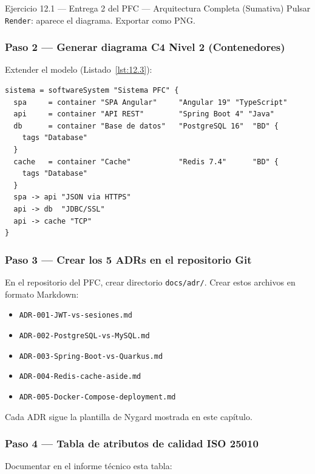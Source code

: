 \begin{cajaejercicio}{Ejercicio 12.1 --- Entrega 2 del PFC --- Arquitectura Completa (Sumativa)}
Pulsar \texttt{Render}: aparece el diagrama. Exportar como PNG.

\subsubsection*{Paso 2 --- Generar diagrama C4 Nivel 2 (Contenedores)}

Extender el modelo (Listado~\ref{lst:12.3}):

\begin{lstlisting}[style=shell,numbers=none,caption={Ejemplo de Shell},label=lst:12.3]
sistema = softwareSystem "Sistema PFC" {
  spa     = container "SPA Angular"     "Angular 19" "TypeScript"
  api     = container "API REST"        "Spring Boot 4" "Java"
  db      = container "Base de datos"   "PostgreSQL 16"  "BD" {
    tags "Database"
  }
  cache   = container "Cache"           "Redis 7.4"      "BD" {
    tags "Database"
  }
  spa -> api "JSON via HTTPS"
  api -> db  "JDBC/SSL"
  api -> cache "TCP"
}
\end{lstlisting}

\subsubsection*{Paso 3 --- Crear los 5 ADRs en el repositorio Git}

En el repositorio del PFC, crear directorio \texttt{docs/adr/}.
Crear estos archivos en formato Markdown:

\begin{itemize}
\item \texttt{ADR-001-JWT-vs-sesiones.md}
\item \texttt{ADR-002-PostgreSQL-vs-MySQL.md}
\item \texttt{ADR-003-Spring-Boot-vs-Quarkus.md}
\item \texttt{ADR-004-Redis-cache-aside.md}
\item \texttt{ADR-005-Docker-Compose-deployment.md}
\end{itemize}

Cada ADR sigue la plantilla de Nygard mostrada en este capítulo.

\subsubsection*{Paso 4 --- Tabla de atributos de calidad ISO 25010}

Documentar en el informe técnico esta tabla:


\end{cajaejercicio}
